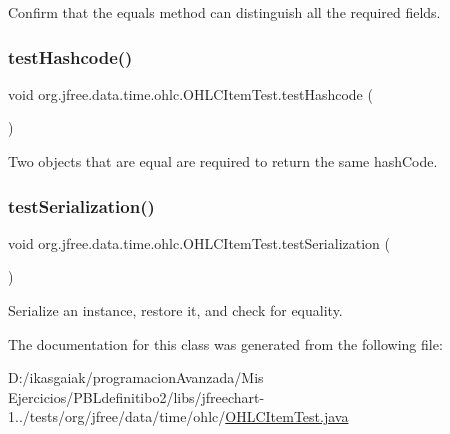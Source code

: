 Confirm that the equals method can distinguish all the required fields. \mbox{\label{classorg_1_1jfree_1_1data_1_1time_1_1ohlc_1_1_o_h_l_c_item_test_af6a63d9a00586262c54c3a708daa2ccd}} 
\subsubsection{\texorpdfstring{test\+Hashcode()}{testHashcode()}}
{\footnotesize\ttfamily void org.\+jfree.\+data.\+time.\+ohlc.\+O\+H\+L\+C\+Item\+Test.\+test\+Hashcode (\begin{DoxyParamCaption}{ }\end{DoxyParamCaption})}

Two objects that are equal are required to return the same hash\+Code. \mbox{\label{classorg_1_1jfree_1_1data_1_1time_1_1ohlc_1_1_o_h_l_c_item_test_a5b45681110a7f3e3a40cf428d4171d2b}} 
\subsubsection{\texorpdfstring{test\+Serialization()}{testSerialization()}}
{\footnotesize\ttfamily void org.\+jfree.\+data.\+time.\+ohlc.\+O\+H\+L\+C\+Item\+Test.\+test\+Serialization (\begin{DoxyParamCaption}{ }\end{DoxyParamCaption})}

Serialize an instance, restore it, and check for equality. 

The documentation for this class was generated from the following file\+:\begin{DoxyCompactItemize}
\item 
D\+:/ikasgaiak/programacion\+Avanzada/\+Mis Ejercicios/\+P\+B\+Ldefinitibo2/libs/jfreechart-\/1../tests/org/jfree/data/time/ohlc/\mbox{\hyperlink{_o_h_l_c_item_test_8java}{O\+H\+L\+C\+Item\+Test.\+java}}\end{DoxyCompactItemize}
